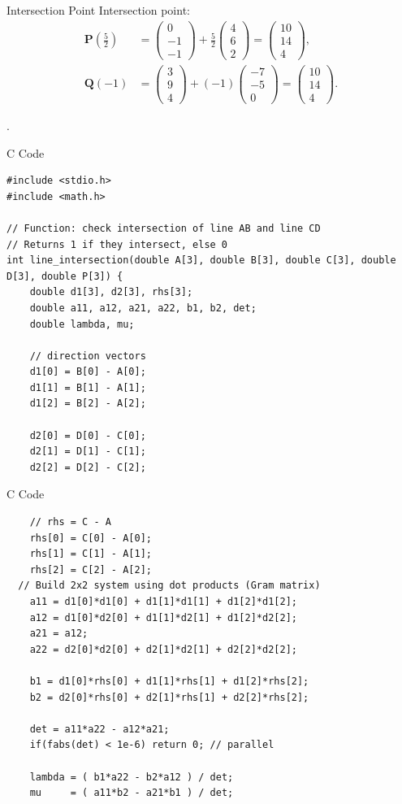 \documentclass{beamer}
\newcommand{\myvec}[1]{\begin{pmatrix}#1\end{pmatrix}}
\renewcommand{\vec}[1]{\mathbf{#1}}
\begin{document}
\begin{frame}{Intersection Point}
Intersection point:
\begin{align}
\vec{P}\!\left(\tfrac{5}{2}\right)
&=\myvec{0\\-1\\-1}+\tfrac{5}{2}\myvec{4\\6\\2}
=\myvec{10\\14\\4},\\
\vec{Q}(-1)
&=\myvec{3\\9\\4}+(-1)\myvec{-7\\-5\\0}
=\myvec{10\\14\\4}.
\end{align}

\boxed{\myvec{10\\14\\4}}.
\end{frame}

\begin{frame}[fragile]{C Code}
\begin{lstlisting}
#include <stdio.h>
#include <math.h>

// Function: check intersection of line AB and line CD
// Returns 1 if they intersect, else 0
int line_intersection(double A[3], double B[3], double C[3], double D[3], double P[3]) {
    double d1[3], d2[3], rhs[3];
    double a11, a12, a21, a22, b1, b2, det;
    double lambda, mu;

    // direction vectors
    d1[0] = B[0] - A[0];
    d1[1] = B[1] - A[1];
    d1[2] = B[2] - A[2];

    d2[0] = D[0] - C[0];
    d2[1] = D[1] - C[1];
    d2[2] = D[2] - C[2];
\end{lstlisting}
\end{frame}

\begin{frame}[fragile]{C Code}
\begin{lstlisting}
    // rhs = C - A
    rhs[0] = C[0] - A[0];
    rhs[1] = C[1] - A[1];
    rhs[2] = C[2] - A[2];
  // Build 2x2 system using dot products (Gram matrix)
    a11 = d1[0]*d1[0] + d1[1]*d1[1] + d1[2]*d1[2];
    a12 = d1[0]*d2[0] + d1[1]*d2[1] + d1[2]*d2[2];
    a21 = a12;
    a22 = d2[0]*d2[0] + d2[1]*d2[1] + d2[2]*d2[2];

    b1 = d1[0]*rhs[0] + d1[1]*rhs[1] + d1[2]*rhs[2];
    b2 = d2[0]*rhs[0] + d2[1]*rhs[1] + d2[2]*rhs[2];

    det = a11*a22 - a12*a21;
    if(fabs(det) < 1e-6) return 0; // parallel

    lambda = ( b1*a22 - b2*a12 ) / det;
    mu     = ( a11*b2 - a21*b1 ) / det;

\end{lstlisting}
\end{frame}
\end{document}
